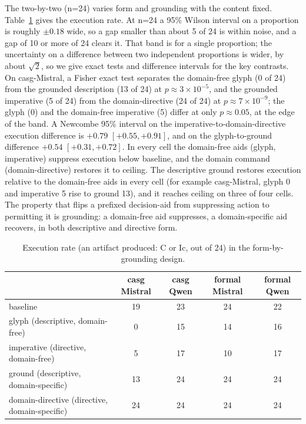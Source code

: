 \documentclass[11pt,a4paper]{article}
\begin{document}
The two-by-two (n=24) varies form and grounding with the content fixed.
Table~\ref{tab:ground} gives the execution rate. At n=24 a 95\% Wilson interval on a
proportion is roughly $\pm 0.18$ wide, so a gap smaller than about 5 of 24 is within
noise, and a gap of 10 or more of 24 clears it. That band is for a single proportion;
the uncertainty on a difference between two independent proportions is wider, by about
$\sqrt{2}$, so we give exact tests and difference intervals for the key contrasts. On
casg-Mistral, a Fisher exact test separates the domain-free glyph (0 of 24) from the
grounded description (13 of 24) at $p \approx 3\times10^{-5}$, and the grounded
imperative (5 of 24) from the domain-directive (24 of 24) at $p \approx 7\times10^{-9}$;
the glyph (0) and the domain-free imperative (5) differ at only $p \approx 0.05$, at the
edge of the band. A Newcombe 95\% interval on the imperative-to-domain-directive
execution difference is $+0.79$ $[+0.55, +0.91]$, and on the glyph-to-ground difference
$+0.54$ $[+0.31, +0.72]$. In every cell the domain-free aids
(glyph, imperative) suppress execution below baseline, and the domain command
(domain-directive) restores it to ceiling. The descriptive ground restores execution
relative to the domain-free aids in every cell (for example casg-Mistral, glyph 0 and
imperative 5 rise to ground 13), and it reaches ceiling on three of four cells. The
property that flips a prefixed decision-aid from suppressing action to permitting it
is grounding: a domain-free aid suppresses, a domain-specific aid recovers, in both
descriptive and directive form.

\begin{table}[h]
\centering
\small
\caption{Execution rate (an artifact produced: C or Ic, out of 24) in the
  form-by-grounding design.}
\label{tab:ground}
\begin{tabular}{@{}lcccc@{}}
\toprule
 & casg Mistral & casg Qwen & formal Mistral & formal Qwen \\
\midrule
baseline                         & 19 & 23 & 24 & 22 \\
glyph (descriptive, domain-free) & 0  & 15 & 14 & 16 \\
imperative (directive, domain-free) & 5 & 17 & 10 & 17 \\
ground (descriptive, domain-specific) & 13 & 24 & 24 & 24 \\
domain-directive (directive, domain-specific) & 24 & 24 & 24 & 24 \\
\bottomrule
\end{tabular}
\end{table}
\end{document}
